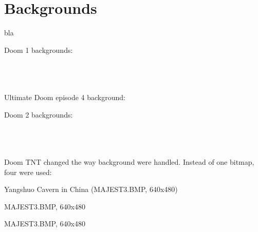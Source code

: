 \par
{}
\par
{}

\par
\section{Backgrounds}
bla

Doom 1 backgrounds:\\
\par
{}\\
\\
\\

Ultimate Doom episode 4 background:\\
\par
{}

Doom 2 backgrounds:\\
\par
\par
{}\\
\\
\\

Doom TNT changed the way background were handled. Instead of one bitmap, four were used:\\



\begin{minipage}{\textwidth}
\par
Yangshuo Cavern in China (MAJEST3.BMP, 640x480)\\
\par
{}
\end{minipage}
\par


\begin{minipage}{\textwidth}
\par
MAJEST3.BMP, 640x480\\
\par
{}
\end{minipage}
\par


\begin{minipage}{\textwidth}
\par
MAJEST3.BMP, 640x480\\
\par
{}
\end{minipage}

